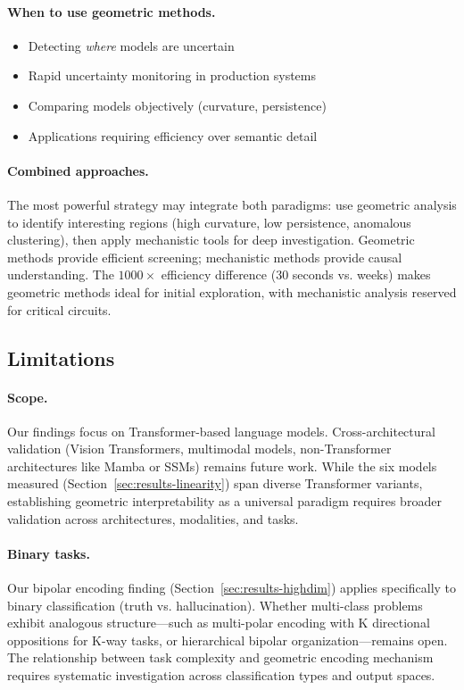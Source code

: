 \documentclass[11pt]{article}
\begin{document}
\paragraph{When to use geometric methods.}
\begin{itemize}
\item Detecting \textit{where} models are uncertain
\item Rapid uncertainty monitoring in production systems
\item Comparing models objectively (curvature, persistence)
\item Applications requiring efficiency over semantic detail
\end{itemize}

\paragraph{Combined approaches.} The most powerful strategy may integrate both paradigms: use geometric analysis to identify interesting regions (high curvature, low persistence, anomalous clustering), then apply mechanistic tools for deep investigation. Geometric methods provide efficient screening; mechanistic methods provide causal understanding. The $1000\times$ efficiency difference (30 seconds vs. weeks) makes geometric methods ideal for initial exploration, with mechanistic analysis reserved for critical circuits.

\subsection{Limitations}

\paragraph{Scope.} Our findings focus on Transformer-based language models. Cross-architectural validation
(Vision Transformers, multimodal models, non-Transformer architectures like Mamba or SSMs) remains future work. While the six models measured (Section~\ref{sec:results-linearity}) span diverse Transformer variants,
establishing geometric interpretability as a universal paradigm requires broader validation across
architectures, modalities, and tasks.

\paragraph{Binary tasks.} Our bipolar encoding finding (Section~\ref{sec:results-highdim}) applies specifically to binary classification (truth vs. hallucination). Whether multi-class problems exhibit analogous structure---such as multi-polar encoding with K directional oppositions for K-way tasks, or hierarchical bipolar organization---remains open. The relationship between task complexity and geometric encoding mechanism requires systematic investigation across classification types and output spaces.
\end{document}
